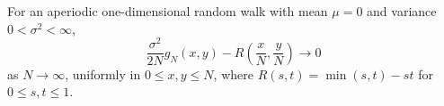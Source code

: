 For an aperiodic one-dimensional random walk with mean $\mu = 0$ and variance $0 < \sigma^2 < \infty$,
$$\frac{\sigma^2}{2N} g_N(x,y) - R\left(\frac{x}{N}, \frac{y}{N}\right) \to 0$$
as $N \to \infty$, uniformly in $0 \leq x, y \leq N$, where $R(s,t) = \min(s,t) - st$ for $0 \leq s, t \leq 1$.
